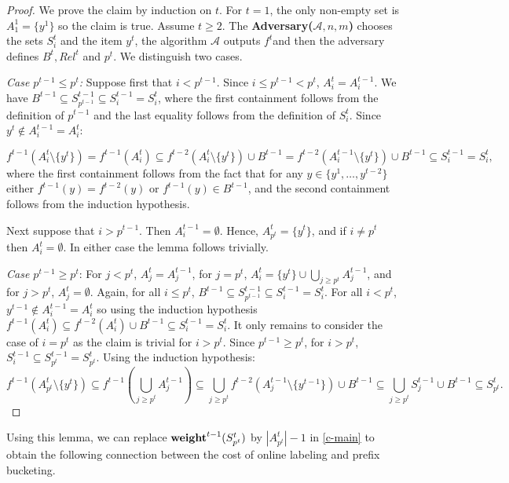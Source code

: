 \documentclass[unicode,review]{siamart1116}
\newcommand{\A}{\mathcal{A}}
\newcommand{\weight}{{\rm {\bf weight}}}
\numberwithin{theorem}{section}
\begin{document}
\begin{proof}  %
We prove the claim by induction on $t$. For $t=1$, the only non-empty set is $A^1_1=\{y^1\}$ so the claim is true.  Assume $t \geq 2$.
The {\bf Adversary($\A,n,m$)} chooses the sets $S^t_i$ and the item $y^t$,  the algorithm $\A$ outputs $f^t$and then
the adversary defines $B^t, Rel^t$ and $p^t$.
We distinguish two cases.


\emph{Case $p^{t-1} \leq p^t$:} Suppose first that $i<p^{t-1}$.
Since $i\le p^{t-1}< p^{t}$, $A^{t}_i = A^{t-1}_i$. 
We have $B^{t-1} \subseteq S^{t-1}_{p^{t-1}} \subseteq S^{t-1}_i = S^t_i$, where
the first containment follows from the definition of $p^{t-1}$ and the last equality follows from the definition of $S^t_i$.
Since  $y^t \not\in A^{t-1}_i = A^t_i$:

$$f^{t-1}(A^t_i \setminus \{y^t\}) = f^{t-1}(A^t_i) \subseteq 
f^{t-2}(A^t_i \setminus \{y^t\}) \cup B^{t-1} = f^{t-2}(A^{t-1}_i\setminus \{y^t\}) \cup B^{t-1} \subseteq S^{t-1}_i = S^t_i,$$
where  the first containment follows from the fact that for any  $y \in
\{y^1,\ldots,y^{t-2}\}$ either $f^{t-1}(y)=f^{t-2}(y)$ or $f^{t-1}(y) \in B^{t-1}$, and the second containment follows from the induction hypothesis.

Next suppose that $i>p^{t-1}$.
Then $A^{t-1}_i=\emptyset$.  Hence, $A^t_{p^t}=\{y^t\}$, and
if $i\not=p^t$ then $A^t_i=\emptyset$.  In either case the lemma follows trivially.

\emph{Case $p^{t-1} \ge p^t$}: For $j < p^{t}$, $A^{t}_j = A^{t-1}_j$, for $j=p^t$, $A^t_i = \{y^t\} \cup \bigcup_{j\ge p^t} A^{t-1}_j$,
and for $j>p^t$, $A^t_j=\emptyset$. Again, for all $i\le p^{t}$, $B^{t-1} \subseteq S^{t-1}_{p^{t-1}} \subseteq S^{t-1}_i = S^t_i$.
For all $i<p^{t}$, $y^{t-1} \not\in A^{t-1}_i = A^t_i$ so using the induction hypothesis
$f^{t-1}(A^t_i) \subseteq f^{t-2}(A^t_i) \cup B^{t-1} \subseteq S^{t-1}_i = S^t_i$.
It only remains to consider the case of $i=p^t$ as the claim is trivial for $i>p^t$.
Since $p^{t-1} \ge p^t$, for $i>p^t$, $S^{t-1}_i \subseteq S^{t-1}_{p^t}=S^t_{p^t}$.
Using the induction hypothesis: 
$$f^{t-1}(A^t_{p^t} \setminus \{y^t\}) \subseteq f^{t-1}(\bigcup_{j\ge p^t} A^{t-1}_j)
\subseteq \bigcup_{j\ge p^t} f^{t-2}( A^{t-1}_j \setminus \{y^{t-1}\}) \cup B^{t-1} \subseteq 
\bigcup_{j \ge p^t} S^{t-1}_{j} \cup B^{t-1} \subseteq S^t_{p^t}.$$
\end{proof}


Using this lemma, we can replace $\weight^{t-1}(S^t_{p^t})$ by  $|A^t_{p^t}|-1$  in \cref{c-main} to 
obtain the following connection between
the cost of online labeling and prefix bucketing.
\end{document}
